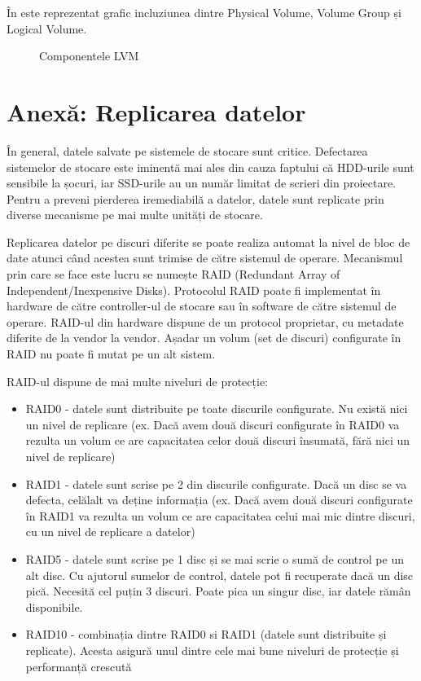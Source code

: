 În  este reprezentat grafic incluziunea
dintre Physical Volume, Volume Group și Logical Volume.

\begin{figure}[htbp]
	\centering
	\def\svgwidth{\columnwidth}
	
	\caption{Componentele LVM}
	\label{fig:lvm-struct}
\end{figure}

\section{Anexă: Replicarea datelor}
\label{sec:storage-replicare}

În general, datele salvate pe sistemele de stocare sunt critice. Defectarea
sistemelor de stocare este iminentă mai ales din cauza faptului că HDD-urile
sunt sensibile la șocuri, iar SSD-urile au un număr limitat de scrieri din
proiectare. Pentru a preveni pierderea iremediabilă a datelor, datele sunt
replicate prin diverse mecanisme pe mai multe unități de stocare.

Replicarea datelor pe discuri diferite se poate realiza automat la nivel de bloc
de date atunci când acestea sunt trimise de către sistemul de operare.
Mecanismul prin care se face este lucru se numește RAID  (Redundant Array of
Independent/Inexpensive Disks). Protocolul RAID poate fi implementat în hardware
de către controller-ul de stocare sau în software de către sistemul de operare.
RAID-ul din hardware dispune de un protocol proprietar, cu metadate diferite de
la vendor la vendor. Așadar un volum (set de discuri) configurate în RAID nu
poate fi mutat pe un alt sistem.

RAID-ul dispune de mai multe niveluri de protecție:

\begin{itemize}
	\item RAID0 - datele sunt distribuite pe toate discurile configurate. Nu
		există nici un nivel de replicare (ex. Dacă avem două discuri
		configurate în RAID0 va rezulta un volum ce are capacitatea
		celor două discuri însumată, fără nici un nivel de replicare)
	\item RAID1 - datele sunt scrise pe 2 din discurile configurate. Dacă un
		disc se va defecta, celălalt va deține informația (ex. Dacă avem
		două discuri configurate în RAID1 va rezulta un volum ce are
		capacitatea celui mai mic dintre discuri, cu un nivel de
		replicare a datelor)
	\item RAID5 - datele sunt scrise pe 1 disc și se mai scrie o sumă de
		control pe un alt disc. Cu ajutorul sumelor de control, datele
		pot fi recuperate dacă un disc pică. Necesită cel puțin 3
		discuri. Poate pica un singur disc, iar datele rămân
		disponibile.
	\item RAID10 - combinația dintre RAID0 si RAID1 (datele sunt distribuite
		și replicate). Acesta asigură unul dintre cele mai bune niveluri
		de protecție și performanță crescută
\end{itemize}

